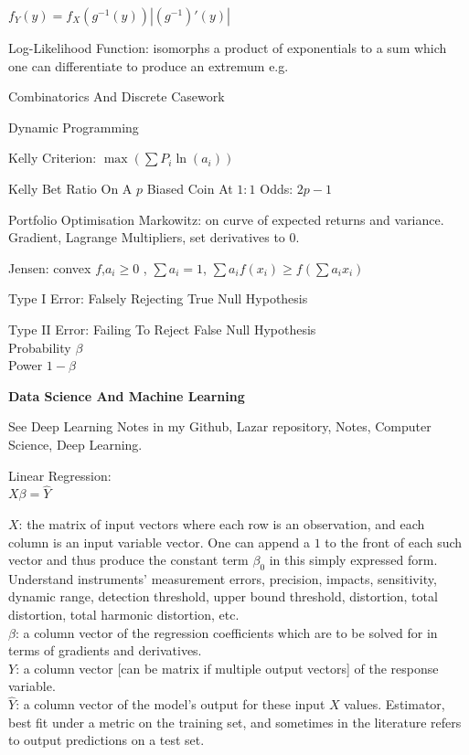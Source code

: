 $f_Y(y)=f_X(g^{-1}(y))|(g^{-1})'(y)|$

Log-Likelihood Function: isomorphs a product of exponentials to a sum which one can differentiate to produce an extremum e.g.

Combinatorics And Discrete Casework

Dynamic Programming

Kelly Criterion: $\max\left( \sum P_i \ln(a_i)\right)$

Kelly Bet Ratio On A $p$ Biased Coin At $1:1$ Odds: $2p-1$

Portfolio Optimisation Markowitz: on curve of expected returns and variance. Gradient, Lagrange Multipliers, set derivatives to $0$.

Jensen: convex $f$,$a_i \ge 0$ , $\sum a_i = 1$, $\sum a_i f(x_i) \ge f\left(\sum a_i x_i \right)$

Type I Error: Falsely Rejecting True Null Hypothesis

Type II Error: Failing To Reject False Null Hypothesis \\
Probability $\beta$ \\
Power $1-\beta$

\newpage

\textbf{Data Science And Machine Learning}

See Deep Learning Notes in my Github, Lazar repository, Notes, Computer Science, Deep Learning.

Linear Regression: \\
$X \beta = \hat{Y}$

$X$: the matrix of input vectors where each row is an observation, and each column is an input variable vector. One can append a $1$ to the front of each such vector and thus produce the constant term $\beta_0$ in this simply expressed form. Understand instruments' measurement errors, precision, impacts, sensitivity, dynamic range, detection threshold, upper bound threshold, distortion, total distortion, total harmonic distortion, etc. \\
$\beta$: a column vector of the regression coefficients which are to be solved for in terms of gradients and derivatives. \\
$Y$: a column vector [can be matrix if multiple output vectors] of the response variable. \\
$\hat{Y}$: a column vector of the model's output for these input $X$ values. Estimator, best fit under a metric on the training set, and sometimes in the literature refers to output predictions on a test set.

